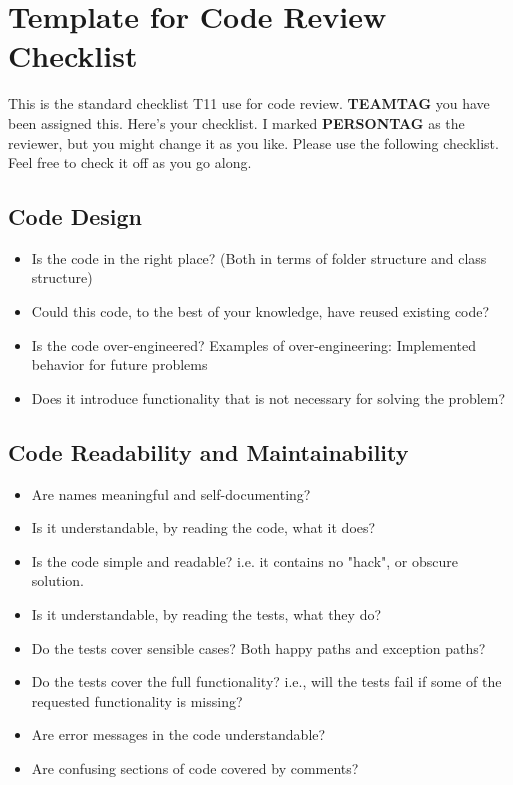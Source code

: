 \chapter{Template for Code Review Checklist} \label{app:code-review-checklist}
This is the standard checklist \gls{T11} use for code review.
\textbf{TEAMTAG} you have been assigned this. Here's your checklist. I
marked \textbf{PERSONTAG} as the reviewer, but you might change it as you
like. Please use the following checklist. Feel free to check it off as
you go along.

\section{Code Design}
\begin{itemize}
\item Is the code in the right place? (Both in terms of folder
 structure and class structure)
\item Could this code, to the best of your knowledge, have reused
 existing code?
\item Is the code over-engineered? Examples of over-engineering:
 Implemented behavior for future problems
\item Does it introduce functionality that is not necessary for
 solving the problem?
\end{itemize}

\section{Code Readability and Maintainability}
\begin{itemize}
\item Are names meaningful and self-documenting?
\item Is it understandable, by reading the code, what it does?
\item Is the code simple and readable? i.e. it contains no "hack",
 or obscure solution.
\item Is it understandable, by reading the tests, what they do?
\item Do the tests cover sensible cases? Both happy paths and
 exception paths?
\item Do the tests cover the full functionality? i.e., will the
 tests fail if some of the requested functionality is missing?
\item Are error messages in the code understandable?
\item Are confusing sections of code covered by comments?
\end{itemize}

